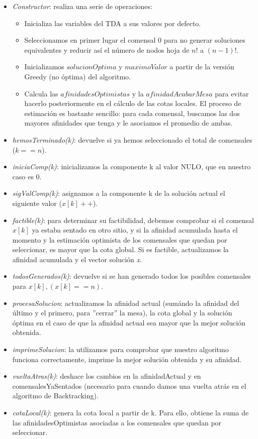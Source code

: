 \documentclass{article}
\begin{document}
\begin{itemize}
\begin{itemize}
			\item \textit {Constructor}: realiza una serie de operaciones:
			\begin{itemize}
				\item Inicializa las variables del TDA a sus valores por defecto.
				\item Seleccionamos en primer lugar el comensal 0 para no generar soluciones equivalentes y reducir así el número de nodos hoja de $n!$ a $(n-1)!$.
				\item Inicializamos $solucionOptima$ y $maximoValor$ a partir de la versión Greedy (no óptima) del algoritmo.
				\item Calcula las $afinidadesOptimistas$ y la $afinidadAcabarMesa$ para evitar hacerlo posteriormente en el cálculo de las cotas locales. El proceso de estimación es bastante sencillo: para cada comensal, buscamos las dos mayores afinidades que tenga y le asociamos el promedio de ambas.
			\end{itemize}
			\item \textit {hemosTerminado(k)}: devuelve si ya hemos seleccionado el total de comensales ($k==n$).
			\item \textit {iniciaComp(k)}: inicializamos la componente k al valor NULO, que en nuestro caso es 0.
			\item \textit{sigValComp(k)}: asignamos a la componente k de la solución actual el siguiente valor ($x[k]++$).
			\item \textit{factible(k)}: para determinar su factibilidad, debemos comprobar si el comensal $x[k]$ ya estaba sentado en otro sitio, y si la afinidad acumulada hasta el momento y la estimación optimista de los comensales que quedan por seleccionar, es mayor que la cota global. 
			Si es factible, actualizamos la afinidad acumulada y el vector solución \textit{x}.
			\item \textit{todosGenerados(k)}: devuelve si se han generado todos los posibles comensales para $x[k], (x[k]==n)$. 
			\item \textit{procesaSolucion}: actualizamos la afinidad actual (sumándo la afinidad del último y el primero, para ''cerrar'' la mesa), la cota global y la solución óptima en el caso de que la afinidad actual sea mayor que la mejor solución obtenida.
			\item \textit{imprimeSolucion}: la utilizamos para comprobar que nuestro algoritmo funciona correctamente, imprime la mejor solución obtenida y su afinidad.
			\item \textit{vueltaAtras(k)}: deshace los cambios en la afinidadActual y en comensalesYaSentados (necesario para cuando damos una vuelta atrás en el algoritmo de Backtracking).
			\item \textit{cotaLocal(k)}: genera la cota local a partir de k. Para ello, obtiene la suma de las afinidadesOptimistas asociadas a los comensales que quedan por seleccionar.
		\end{itemize}
	\end{itemize}
\end{document}
